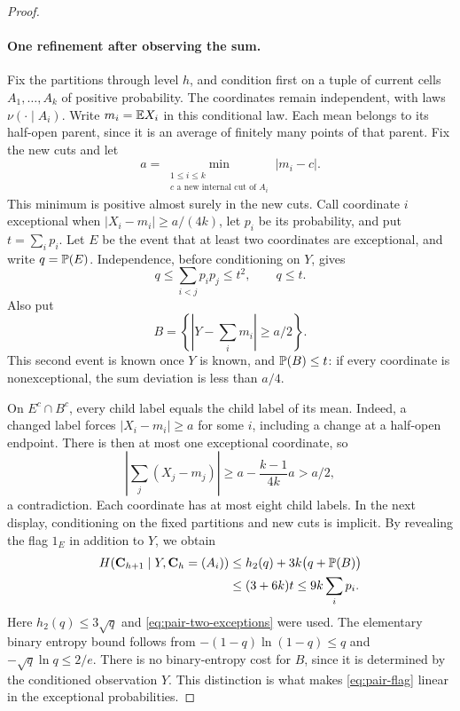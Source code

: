 \begin{proof}
\paragraph{One refinement after observing the sum.}
Fix the partitions through level $h$, and condition first on a tuple
of current cells $A_1,\ldots,A_k$ of positive probability.
The coordinates remain independent, with laws $\nu(\cdot\mid A_i)$.
Write $m_i=\E X_i$ in this conditional law.  Each mean belongs to
its half-open parent, since it is an average of finitely many points
of that parent.  Fix the new cuts and let
\[
 a=\min_{\substack{1\le i\le k\\
              c\text{ a new internal cut of }A_i}}|m_i-c|.
\]
This minimum is positive almost surely in the new cuts.
Call coordinate $i$ exceptional when $|X_i-m_i|\ge a/(4k)$,
let $p_i$ be its probability, and put $t=\sum_i p_i$.
Let $E$ be the event that at least two coordinates are exceptional,
and write $q=\P(E)$.  Independence, before conditioning on $Y$, gives
\begin{equation}\label{eq:pair-two-exceptions}
 q\le\sum_{i<j}p_ip_j\le t^2,
 \qquad q\le t.
\end{equation}
Also put
\[
 B=\left\{\left|Y-\sum_i m_i\right|\ge a/2\right\}.
\]
This second event is known once $Y$ is known, and $\P(B)\le t$:
if every coordinate is nonexceptional, the sum deviation is less
than $a/4$.

On $E^c\cap B^c$, every child label equals the child label of its
mean.  Indeed, a changed label forces $|X_i-m_i|\ge a$ for some
$i$, including a change at a half-open endpoint.  There is then at
most one exceptional coordinate, so
\[
 \left|\sum_j(X_j-m_j)\right|
 \ge a-\frac{k-1}{4k}a>a/2,
\]
a contradiction.  Each coordinate has at most eight child labels.
In the next display, conditioning on the fixed partitions and new cuts
is implicit.  By revealing the flag $1_E$ in addition to $Y$, we obtain
\begin{align}
 H(\mathbf C_{h+1}\mid Y,\mathbf C_h=(A_i))
 &\le h_2(q)+3k\bigl(q+\P(B)\bigr)\notag\\
 &\le (3+6k)t\le9k\sum_i p_i.
 \label{eq:pair-flag}
\end{align}
Here $h_2(q)\le3\sqrt q$ and
\eqref{eq:pair-two-exceptions} were used.  The elementary binary
entropy bound follows from
$-(1-q)\ln(1-q)\le q$ and $-\sqrt q\ln q\le2/e$.
There is no binary-entropy cost for $B$, since it is determined by
the conditioned observation $Y$.  This distinction is what makes
\eqref{eq:pair-flag} linear in the exceptional probabilities.


\end{proof}
